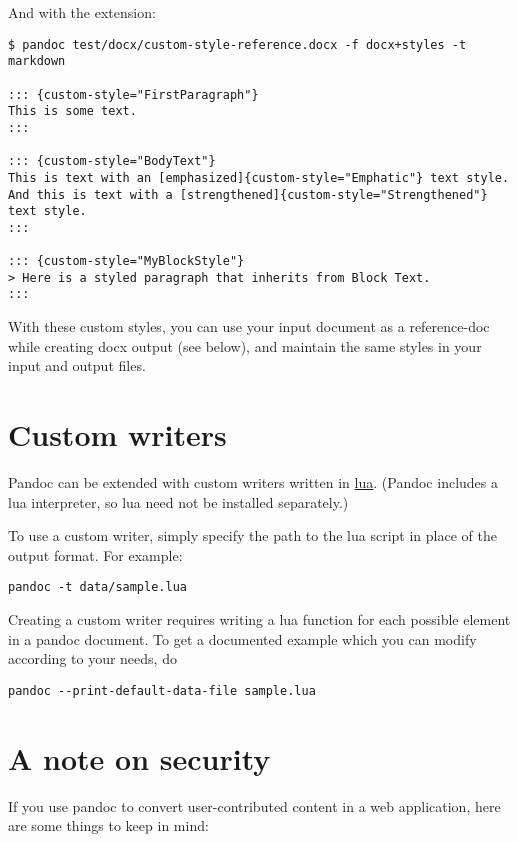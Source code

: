 And with the extension:

\begin{verbatim}
$ pandoc test/docx/custom-style-reference.docx -f docx+styles -t markdown

::: {custom-style="FirstParagraph"}
This is some text.
:::

::: {custom-style="BodyText"}
This is text with an [emphasized]{custom-style="Emphatic"} text style.
And this is text with a [strengthened]{custom-style="Strengthened"}
text style.
:::

::: {custom-style="MyBlockStyle"}
> Here is a styled paragraph that inherits from Block Text.
:::
\end{verbatim}

With these custom styles, you can use your input document as a
reference-doc while creating docx output (see below), and maintain the
same styles in your input and output files.

\hypertarget{custom-writers}{%
\section{Custom writers}\label{custom-writers}}

Pandoc can be extended with custom writers written in
\href{http://www.lua.org}{lua}. (Pandoc includes a lua interpreter, so
lua need not be installed separately.)

To use a custom writer, simply specify the path to the lua script in
place of the output format. For example:

\begin{verbatim}
pandoc -t data/sample.lua
\end{verbatim}

Creating a custom writer requires writing a lua function for each
possible element in a pandoc document. To get a documented example which
you can modify according to your needs, do

\begin{verbatim}
pandoc --print-default-data-file sample.lua
\end{verbatim}

\hypertarget{a-note-on-security}{%
\section{A note on security}\label{a-note-on-security}}

If you use pandoc to convert user-contributed content in a web
application, here are some things to keep in mind:


